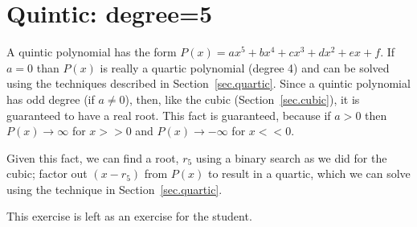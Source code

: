 \section{Quintic: degree=5}
\label{sec.quintic}

A quintic polynomial has the form $P(x) = a x^5 + b x^4 + c x^3 + d x^2 + e x + f$.
If $a=0$ than $P(x)$ is really
a quartic polynomial (degree 4) and can be solved using the techniques described in Section~\ref{sec.quartic}.
Since a quintic polynomial has odd degree (if $a\neq 0$),
then, like the cubic (Section~\ref{sec.cubic}), it is guaranteed to have a real root.  This fact
is guaranteed, because if
$a>0$ then $P(x)\to \infty$ for $x>>0$ and $P(x)\to -\infty$ for $x<<0$.

Given this fact, we can find a root, $r_5$ using a binary search as we did for the cubic;
factor out $(x-r_5)$ from $P(x)$ to result in a quartic, which we can solve using
the technique in Section~\ref{sec.quartic}.

This exercise is left as an exercise for the student.
